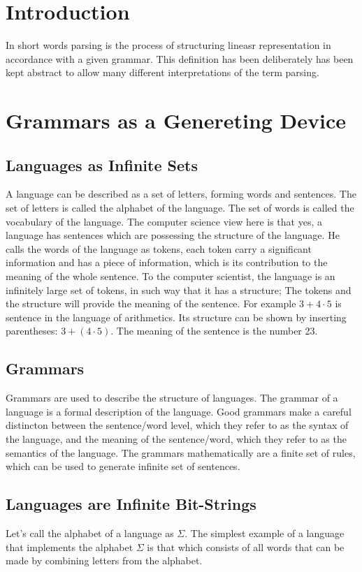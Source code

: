 \section{Introduction}
In short words parsing is the process of structuring lineasr representation in accordance with a given grammar. This definition has been deliberately has been kept abstract to allow many different interpretations of the term parsing.

\section{Grammars as a Genereting Device}
\subsection{Languages as Infinite Sets}
A language can be described as a set of letters, forming words and sentences. The set of letters is called the alphabet of the language. The set of words is called the vocabulary of the language.
The computer science view here is that yes, a language has sentences which are possessing the structure of the language. 
He calls the words of the language as tokens, each token carry a significant information and has a piece of information, which is its contribution to the meaning of the whole sentence. 
To the computer scientist, the language is an infinitely large set of tokens, in such way that it has a structure; 
The tokens and the structure will provide the meaning of the sentence. For example $3+4\cdot5$ is sentence in the language of arithmetics.
Its structure can be shown by inserting parentheses: $3+(4\cdot5)$. The meaning of the sentence is the number 23.

\subsection{Grammars}
Grammars are used to describe the structure of languages. The grammar of a language is a formal description of the language. 
Good grammars make a careful distincton between the sentence/word level, which they refer to as the syntax of the language, and the meaning of the sentence/word, which they refer to as the semantics of the language.
The grammars mathematically are a finite set of rules, which can be used to generate infinite set of sentences.

\subsection{Languages are Infinite Bit-Strings}
Let's call the alphabet of a language as $\Sigma$. The simplest example of a language that implements the alphabet $\Sigma$ is that which consists of all words that can be made by combining letters from the alphabet. 

